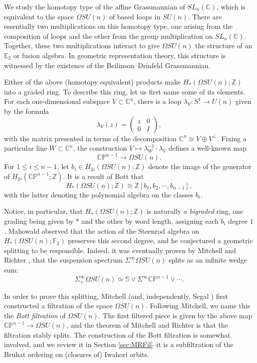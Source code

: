 We study the homotopy type of the affine Grassmannian of $SL_n(\mathbb{C})$, which is equivalent to the space $\Omega SU(n)$ of based loops in $SU(n)$.  There are essentially two multiplications on this homotopy type, one arising from the composition of loops and the other from the group multiplication on $SL_n(\mathbb{C})$.  Together, these two multiplications interact to give $\Omega SU(n)$ the structure of an $\mathbb{E}_2$ or fusion algebra.  In geometric representation theory, this structure is witnessed by the existence of the Beilinson--Drinfeld Grassmannian.

Either of the above (homotopy equivalent) products make $H_*(\Omega SU(n);\mathbb{Z})$ into a graded ring.  To describe this ring, let us first name some of its elements.  For each one-dimensional subspace $V \subset \mathbb{C}^n$, there is a loop $\lambda_V:S^1 \rightarrow U(n)$ given by the formula
$$\lambda_V(z)=\left( \begin{array}{cc} z & 0 \\ 0 & I \end{array} \right),$$
with the matrix presented in terms of the decomposition $\mathbb{C}^n \cong V \oplus V^{\perp}$.  Fixing a particular line $W \subset \mathbb{C}^n$, the construction $V \mapsto \lambda_W^{-1} \cdot \lambda_V$ defines a well-known map
$$\mathbb{CP}^{n-1} \rightarrow \Omega SU(n).$$
For $1 \le i \le n-1$, let $b_i \in H_{2i}(\Omega SU(n);\mathbb{Z})$ denote the image of the generator of $H_{2i}(\mathbb{CP}^{n-1};\mathbb{Z})$.  It is a result of Bott \cite{Bott} that
$$H_*(\Omega SU(n);\mathbb{Z}) \cong \mathbb{Z}[b_1,b_2,\cdots,b_{n-1}],$$
with the latter denoting the polynomial algebra on the classes $b_i$.

Notice, in particular, that $H_*(\Omega SU(n);\mathbb{Z})$ is naturally a \textit{bigraded} ring, one grading being given by $*$ and the other by word length, assigning each $b_i$ degree $1$.  Mahowald observed that the action of the Steenrod algebra on $H_*(\Omega SU(n);\mathbb{F}_2)$ preserves this second degree, and he conjectured a geometric splitting to be responsible.  Indeed, it was eventually proven by Mitchell and Richter \cite[Theorem 2.1]{CrabbMitchell}, that the suspension spectrum $\Sigma^{\infty} \Omega SU(n)$ splits as an infinite wedge sum:
$$\Sigma^{\infty}_+ \Omega SU(n) \simeq \mathbb{S} \vee \Sigma^{\infty} \mathbb{CP}^{n-1} \vee \cdots.$$

In order to prove this splitting, Mitchell \cite{MitchellSU(n)} (and, independently, Segal \cite{Segal}) first constructed a filtration of the space $\Omega SU(n)$.  Following Mitchell, we name this the \textit{Bott filtration} of $\Omega SU(n)$.  The first filtered piece is given by the above map $\mathbb{CP}^{n-1} \rightarrow \Omega SU(n)$, and the theorem of Mitchell and Richter is that the filtration stably splits.  The construction of the Bott filtration is somewhat involved, and we review it in Section \ref{sec:MRFil}--it is a subfiltration of the Bruhat ordering on (closures of) Iwahori orbits.

